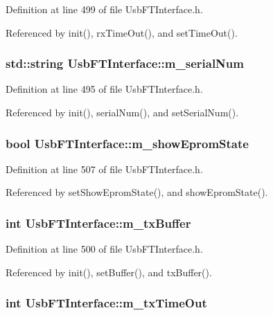 Definition at line 499 of file UsbFTInterface.h.

Referenced by init(), rxTimeOut(), and setTimeOut().\hypertarget{classUsbFTInterface_a031610ca38939734ec7431d80f5f299f}{
\subsubsection[{m\_\-serialNum}]{\setlength{\rightskip}{0pt plus 5cm}std::string {\bf UsbFTInterface::m\_\-serialNum}}}
\label{classUsbFTInterface_a031610ca38939734ec7431d80f5f299f}


Definition at line 495 of file UsbFTInterface.h.

Referenced by init(), serialNum(), and setSerialNum().\hypertarget{classUsbFTInterface_aa5c215777af41de94a2b371c59c88c7c}{
\subsubsection[{m\_\-showEpromState}]{\setlength{\rightskip}{0pt plus 5cm}bool {\bf UsbFTInterface::m\_\-showEpromState}}}
\label{classUsbFTInterface_aa5c215777af41de94a2b371c59c88c7c}


Definition at line 507 of file UsbFTInterface.h.

Referenced by setShowEpromState(), and showEpromState().\hypertarget{classUsbFTInterface_a10385649160531f6976d55176bee1f2d}{
\subsubsection[{m\_\-txBuffer}]{\setlength{\rightskip}{0pt plus 5cm}int {\bf UsbFTInterface::m\_\-txBuffer}}}
\label{classUsbFTInterface_a10385649160531f6976d55176bee1f2d}


Definition at line 500 of file UsbFTInterface.h.

Referenced by init(), setBuffer(), and txBuffer().\hypertarget{classUsbFTInterface_af88e498a8ed759e35ae9e94f74ffcf56}{
\subsubsection[{m\_\-txTimeOut}]{\setlength{\rightskip}{0pt plus 5cm}int {\bf UsbFTInterface::m\_\-txTimeOut}}}
\label{classUsbFTInterface_af88e498a8ed759e35ae9e94f74ffcf56}


